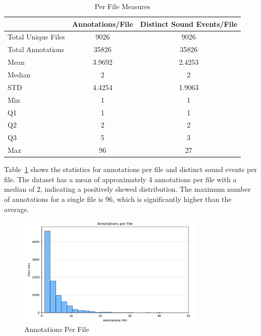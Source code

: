 \documentclass{article}
\begin{document}
\begin{table}[H]
  \caption{Per File Measures}
  \label{tab:per_file}
  \centering
  \begin{tabular}{lcc}
    \toprule
    & Annotations/File & Distinct Sound Events/File \\
    \midrule
    Total Unique Files & 9026 & 9026 \\
    Total Annotations & 35826 & 35826 \\
    Mean & 3.9692 & 2.4253 \\
    Median & 2 & 2 \\
    STD & 4.4254 & 1.9063 \\
    Min & 1 & 1 \\
    Q1 & 1 & 1 \\
    Q2 & 2 & 2 \\
    Q3 & 5 & 3 \\
    Max & 96 & 27 \\
    \bottomrule
  \end{tabular}
\end{table}

Table~\ref{tab:per_file} shows the statistics for annotations per file and distinct sound events per file. The dataset has a mean of approximately 4 annotations per file with a median of 2, indicating a positively skewed distribution. The maximum number of annotations for a single file is 96, which is significantly higher than the average.

\begin{figure}[H]
  \centering
  \includegraphics[width=0.8\textwidth]{figures/annotation_quality/annotations_per_file.png}
  \caption{Annotations Per File}
  \label{fig:annotations_per_file}
\end{figure}
\end{document}
